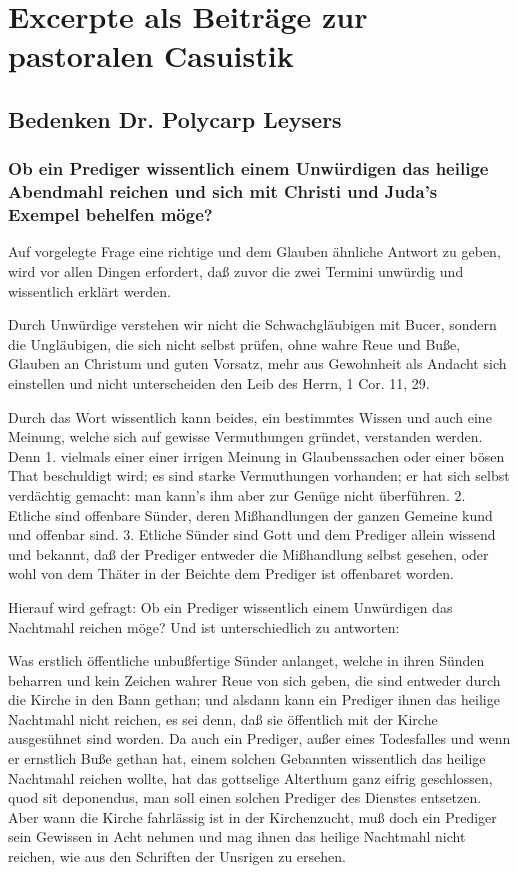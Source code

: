 \chapter[Excerpte zur pastoralen Casuistik]{Excerpte als Beiträge zur pastoralen Casuistik}

\section{Bedenken Dr. Polycarp Leysers}
\subsection[Ob ein Prediger einem Unwürdigen]{Ob ein Prediger wissentlich einem Unwürdigen das heilige Abendmahl reichen und sich mit Christi und Juda’s Exempel behelfen möge?}

Auf vorgelegte Frage eine richtige und dem Glauben ähnliche Antwort zu geben, wird vor allen Dingen erfordert, daß zuvor die zwei Termini unwürdig und wissentlich erklärt werden.

Durch Unwürdige verstehen wir nicht die Schwachgläubigen mit Bucer, sondern die Ungläubigen, die sich nicht selbst prüfen, ohne wahre Reue und Buße, Glauben an Christum und guten Vorsatz, mehr aus Gewohnheit als Andacht sich einstellen und nicht unterscheiden den Leib des Herrn, 1 Cor. 11, 29.

Durch das Wort wissentlich kann beides, ein bestimmtes Wissen und auch eine Meinung, welche sich auf gewisse Vermuthungen gründet, verstanden werden. Denn 1. vielmals einer einer irrigen Meinung in Glaubenssachen oder einer bösen That beschuldigt wird; es sind starke Vermuthungen vorhanden; er hat sich selbst verdächtig gemacht: man kann’s ihm aber zur Genüge nicht überführen. 2. Etliche sind offenbare Sünder, deren Mißhandlungen der ganzen Gemeine kund und offenbar sind. 3. Etliche Sünder sind Gott und dem Prediger allein wissend und bekannt, daß der Prediger entweder die Mißhandlung selbst gesehen, oder wohl von dem Thäter in der Beichte dem Prediger ist offenbaret worden.

Hierauf wird gefragt: Ob ein Prediger wissentlich einem Unwürdigen das Nachtmahl reichen möge? Und ist unterschiedlich zu antworten:

Was erstlich öffentliche unbußfertige Sünder anlanget, welche in ihren Sünden beharren und kein Zeichen wahrer Reue von sich geben, die sind entweder durch die Kirche in den Bann gethan; und alsdann kann ein Prediger ihnen das heilige Nachtmahl nicht reichen, es sei denn, daß sie öffentlich mit der Kirche ausgesühnet sind worden. Da auch ein Prediger, außer eines Todesfalles und wenn er ernstlich Buße gethan hat, einem solchen Gebannten wissentlich das heilige Nachtmahl reichen wollte, hat das gottselige Alterthum ganz eifrig geschlossen, quod sit deponendus, man soll einen solchen Prediger des Dienstes entsetzen. Aber wann die Kirche fahrlässig ist in der Kirchenzucht, muß doch ein Prediger sein Gewissen in Acht nehmen und mag ihnen das heilige Nachtmahl nicht reichen, wie aus den Schriften der Unsrigen zu ersehen.

